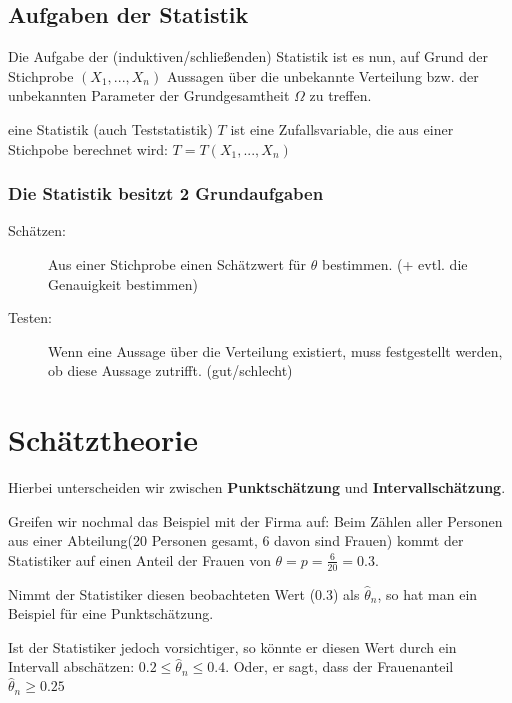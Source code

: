 \subsection{Aufgaben der Statistik}
Die Aufgabe der (induktiven/schließenden) Statistik ist es nun, auf Grund der Stichprobe $(X_1, ..., X_n)$ Aussagen über die unbekannte Verteilung bzw. der unbekannten Parameter der Grundgesamtheit $\Omega$ zu treffen.

\begin{definition}
eine Statistik (auch Teststatistik) $T$ ist eine Zufallsvariable, die aus einer Stichpobe berechnet wird: $T=T(X_1,...,X_n)$
\end{definition}

\subsubsection{Die Statistik besitzt 2 Grundaufgaben}
\begin{description}
    \item [Schätzen:] Aus einer Stichprobe einen Schätzwert für $\theta$ bestimmen. (+ evtl. die Genauigkeit bestimmen)
    \item [Testen:] Wenn eine Aussage über die Verteilung existiert, muss festgestellt werden, ob diese Aussage zutrifft. (gut/schlecht)
\end{description}

\section{Schätztheorie}
Hierbei unterscheiden wir zwischen \textbf{Punktschätzung} und \textbf{Intervallschätzung}.
\begin{bsp}\label{bsp:schaetztheorie}
Greifen wir nochmal das Beispiel mit der Firma auf:
Beim Zählen aller Personen aus einer Abteilung(20 Personen gesamt, 6 davon sind Frauen) kommt der Statistiker auf einen Anteil der Frauen von $\theta=p=\frac{6}{20}=0.3$. 

Nimmt der Statistiker diesen beobachteten Wert ($0.3$) als $\hat\theta_n$, so hat man ein Beispiel für eine Punktschätzung.

Ist der Statistiker jedoch vorsichtiger, so könnte er diesen Wert durch ein Intervall abschätzen: $0.2\leq\hat\theta_n\leq0.4$. Oder, er sagt, dass der Frauenanteil $\hat\theta_n\geq 0.25$
\end{bsp}
